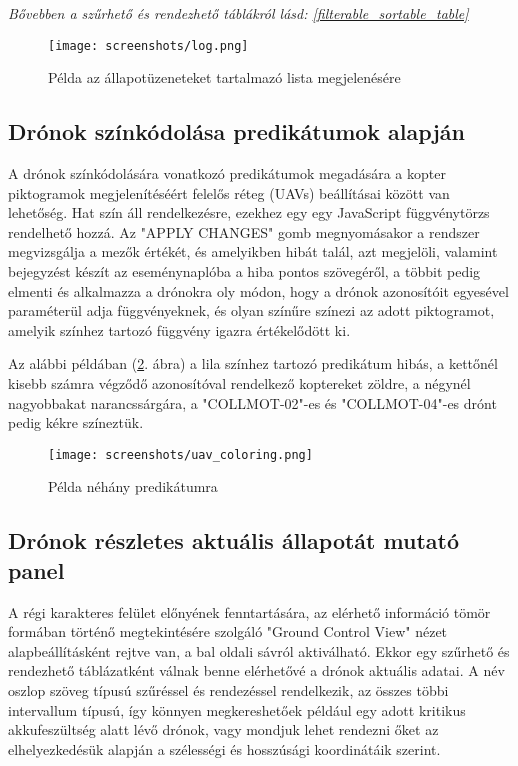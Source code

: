 \textit{
  Bővebben a szűrhető és rendezhető táblákról lásd:
  \ref{filterable_sortable_table}
}

\begin{figure}[H]
  \texttt{[image: screenshots/log.png]}
  \caption{Példa az állapotüzeneteket tartalmazó lista megjelenésére}
  \label{fig:log}
\end{figure}


\subsection{Drónok színkódolása predikátumok alapján}

A drónok színkódolására vonatkozó predikátumok megadására a kopter piktogramok
megjelenítéséért felelős réteg (UAVs) beállításai között van lehetőség.
Hat szín áll rendelkezésre, ezekhez egy egy JavaScript függvénytörzs rendelhető
hozzá. Az "APPLY CHANGES" gomb megnyomásakor a rendszer megvizsgálja a mezők
értékét, és amelyikben hibát talál, azt megjelöli, valamint bejegyzést készít az
eseménynaplóba a hiba pontos szövegéről, a többit pedig elmenti és alkalmazza a
drónokra oly módon, hogy a drónok azonosítóit egyesével paraméterül adja
függvényeknek, és olyan színűre színezi az adott piktogramot, amelyik színhez
tartozó függvény igazra értékelődött ki.

Az alábbi példában (\ref{fig:uav_coloring}. ábra) a lila színhez tartozó
predikátum hibás, a kettőnél kisebb számra végződő azonosítóval rendelkező
koptereket zöldre, a négynél nagyobbakat narancssárgára, a "COLLMOT-02"-es és
"COLLMOT-04"-es drónt pedig kékre színeztük.

\begin{figure}[H]
  \texttt{[image: screenshots/uav\_coloring.png]}
  \caption{Példa néhány predikátumra}
  \label{fig:uav_coloring}
\end{figure}

\subsection{Drónok részletes aktuális állapotát mutató panel}

A régi karakteres felület előnyének fenntartására, az elérhető információ tömör
formában történő megtekintésére szolgáló "Ground Control View" nézet
alapbeállításként rejtve van, a bal oldali sávról aktiválható. Ekkor egy
szűrhető és rendezhető táblázatként válnak benne elérhetővé a drónok aktuális
adatai.
A név oszlop szöveg típusú szűréssel és rendezéssel rendelkezik, az összes többi
intervallum típusú, így könnyen megkereshetőek például egy adott kritikus
akkufeszültség alatt lévő drónok, vagy mondjuk lehet rendezni őket az
elhelyezkedésük alapján a szélességi és hosszúsági koordinátáik szerint.

